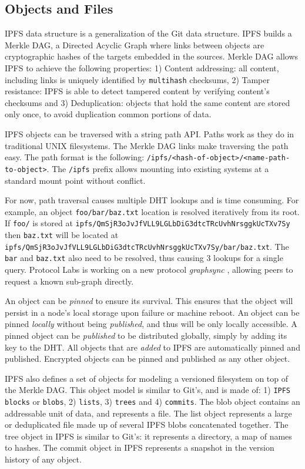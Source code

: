 \documentclass[a4paper,11pt,oneside]{report}
\begin{document}
\subsection{Objects and Files}

IPFS data structure is a generalization of the Git data structure. IPFS builds a Merkle DAG, a Directed Acyclic Graph where links between objects are cryptographic hashes of the targets embedded in the sources. Merkle DAG allows IPFS to achieve the following properties:
1) Content addressing: all content, including links is uniquely identified by \texttt{multihash} checksums, 2) Tamper resistance: IPFS is able to detect tampered content by verifying content's checksums and 3) Deduplication: objects that hold the same content are stored only once, to avoid duplication common portions of data.

IPFS objects can be traversed with a string path API. Paths work as they do in traditional UNIX filesystems. The Merkle DAG links make traversing the path easy. The path format is the following: \texttt{/ipfs/<hash-of-object>/<name-path-to-object>}. The \texttt{/ipfs} prefix allows mounting into existing systems at a standard mount point without conflict.

For now, path traversal causes multiple DHT lookups and is time consuming. For example, an object \texttt{foo/bar/baz.txt} location is resolved iteratively from its root. If \texttt{foo/} is stored at \texttt{ipfs/QmSjR3oJvJfVLL9LGLbDiG3dtcTRcUvhNrsggkUcTXv7Sy} then \texttt{baz.txt} will be located at \texttt{ipfs/QmSjR3oJvJfVLL9LGLbDiG3dtcTRcUvhNrsggkUcTXv7Sy/bar/baz.txt}. The \texttt{bar} and \texttt{baz.txt} also need to be resolved, thus causing 3 lookups for a single query. Protocol Labs is working on a new protocol \textit{graphsync} \cite{graphsync}, allowing peers to request a known sub-graph directly.

An object can be \textit{pinned} to ensure its survival. This ensures that the object will persist in a node's local storage upon failure or machine reboot. An object can be pinned \textit{locally} without being \textit{published}, and thus will be only locally accessible. A pinned object can be \textit{published} to be distributed globally, simply by adding its key to the DHT. All objects that are \textit{added} to IPFS are automatically pinned and published. Encrypted objects can be pinned and published as any other object.

IPFS also defines a set of objects for modeling a versioned filesystem on top of the Merkle DAG. This object model is similar to Git’s, and is made of: 1) \texttt{IPFS blocks} or \texttt{blobs}, 2) \texttt{lists}, 3) \texttt{trees} and 4) \texttt{commits}. The blob object contains an addressable unit of data, and represents a file. The list object represents a large or deduplicated file made up of several IPFS blobs concatenated together. The tree object in IPFS is similar to Git’s: it represents a directory, a map of names to hashes. The commit object in IPFS represents a snapshot in the version history of any object.
\end{document}
